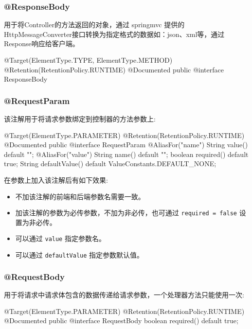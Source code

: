 \subsubsection{@ResponseBody}

用于将Controller的方法返回的对象，通过 springmvc 提供的HttpMessageConverter接口转换为指定格式的数据如：json、xml等，通过Response响应给客户端。

\begin{Java}
@Target({ElementType.TYPE, ElementType.METHOD})
@Retention(RetentionPolicy.RUNTIME)
@Documented
public @interface ResponseBody { }    
\end{Java}

\subsubsection{@RequestParam}

该注解用于将请求参数绑定到控制器的方法参数上:

\begin{Java}
@Target(ElementType.PARAMETER)
@Retention(RetentionPolicy.RUNTIME)
@Documented
public @interface RequestParam {
    @AliasFor("name")
    String value() default "";
    @AliasFor("value")
    String name() default "";
    boolean required() default true;
    String defaultValue() default ValueConstants.DEFAULT_NONE;
}
\end{Java}

在参数上加入该注解后有如下效果:
\begin{itemize}
    \item 不加该注解的前端和后端参数名需要一致。
    \item 加该注解的参数为必传参数，不加为非必传，也可通过 \texttt{required = false} 设置为非必传。
    \item 可以通过 \texttt{value} 指定参数名。
    \item 可以通过 \texttt{defaultValue} 指定参数默认值。
\end{itemize}

\subsubsection{@RequestBody}

用于将请求中请求体包含的数据传递给请求参数，一个处理器方法只能使用一次:

\begin{Java}
@Target(ElementType.PARAMETER)
@Retention(RetentionPolicy.RUNTIME)
@Documented
public @interface RequestBody {
    boolean required() default true;
}
\end{Java}


